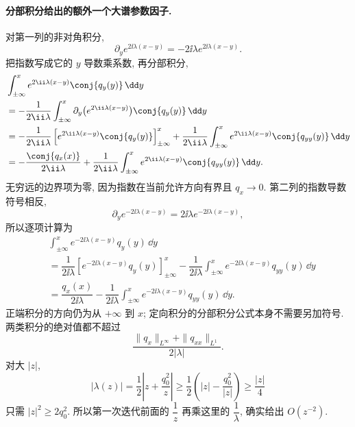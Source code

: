 \paragraph{分部积分给出的额外一个大谱参数因子.}
对第一列的非对角积分,
\[
\partial_y e^{2\ii\lambda(x-y)}
=-2\ii\lambda e^{2\ii\lambda(x-y)}.
\]
把指数写成它的 $y$ 导数乘系数, 再分部积分,
\begin{align*}
&\int_{\pm\infty}^{x}e^{2\ii\lambda(x-y)}\conj{q_y(y)}\,\dd y\\
&=-\dfrac{1}{2\ii\lambda}
\int_{\pm\infty}^{x}\partial_y\bigl(e^{2\ii\lambda(x-y)}\bigr)
\conj{q_y(y)}\,\dd y\\
&=-\dfrac{1}{2\ii\lambda}
\left[e^{2\ii\lambda(x-y)}\conj{q_y(y)}\right]_{\pm\infty}^{x}
+\dfrac{1}{2\ii\lambda}
\int_{\pm\infty}^{x}e^{2\ii\lambda(x-y)}\conj{q_{yy}(y)}\,\dd y\\
&=-\dfrac{\conj{q_x(x)}}{2\ii\lambda}
+\dfrac{1}{2\ii\lambda}
\int_{\pm\infty}^{x}e^{2\ii\lambda(x-y)}\conj{q_{yy}(y)}\,\dd y.
\end{align*}
无穷远的边界项为零, 因为指数在当前允许方向有界且 $q_x\to0$.
第二列的指数导数符号相反,
\[
\partial_y e^{-2\ii\lambda(x-y)}
=2\ii\lambda e^{-2\ii\lambda(x-y)},
\]
所以逐项计算为
\begin{align*}
&\int_{\pm\infty}^{x}e^{-2\ii\lambda(x-y)}q_y(y)\,\dd y\\
&=\dfrac{1}{2\ii\lambda}
\left[e^{-2\ii\lambda(x-y)}q_y(y)\right]_{\pm\infty}^{x}
-\dfrac{1}{2\ii\lambda}
\int_{\pm\infty}^{x}e^{-2\ii\lambda(x-y)}q_{yy}(y)\,\dd y\\
&=\dfrac{q_x(x)}{2\ii\lambda}
-\dfrac{1}{2\ii\lambda}
\int_{\pm\infty}^{x}e^{-2\ii\lambda(x-y)}q_{yy}(y)\,\dd y.
\end{align*}
正端积分的方向仍为从 $+\infty$ 到 $x$;
定向积分的分部积分公式本身不需要另加符号.
两类积分的绝对值都不超过
\[
\dfrac{\|q_x\|_{L^\infty}+\|q_{xx}\|_{L^1}}{2|\lambda|}.
\]
对大 $|z|$,
\[
|\lambda(z)|
=\dfrac{1}{2}\left|z+\dfrac{q_0^2}{z}\right|
\ge\dfrac{1}{2}\left(|z|-\dfrac{q_0^2}{|z|}\right)
\ge\dfrac{|z|}{4}
\]
只需 $|z|^2\ge2q_0^2$.
所以第一次迭代前面的 $\dfrac{1}{z}$ 再乘这里的 $\dfrac{1}{\lambda}$,
确实给出 $O(z^{-2})$.

